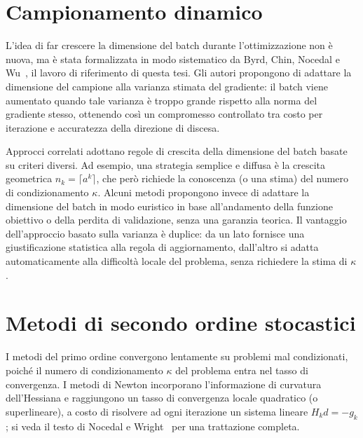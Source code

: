 \documentclass[italian, a4paper, twoside, binding=6mm]{sapthesis}
\begin{document}
\section{Campionamento dinamico}

L'idea di far crescere la dimensione del batch durante l'ottimizzazione
non è nuova, ma è stata formalizzata in modo sistematico da Byrd, Chin, Nocedal
e Wu~\cite{byrd2012}, il lavoro di riferimento di questa tesi. Gli autori
propongono di adattare la dimensione del campione alla varianza stimata del
gradiente: il batch viene aumentato quando tale varianza è troppo grande
rispetto alla norma del gradiente stesso, ottenendo così un compromesso
controllato tra costo per iterazione e accuratezza della direzione di discesa.

Approcci correlati adottano regole di crescita della dimensione del batch
basate su criteri diversi. Ad esempio, una strategia semplice e diffusa è la
crescita geometrica $n_k = \lceil a^k \rceil$, che però richiede la
conoscenza (o una stima) del numero di condizionamento $\kappa$. Alcuni metodi
propongono invece di adattare la dimensione del batch in modo euristico in base
all'andamento della funzione obiettivo o della perdita di validazione, senza
una garanzia teorica. Il vantaggio dell'approccio basato sulla varianza è
duplice: da un lato fornisce una giustificazione statistica alla regola
di aggiornamento, dall'altro si adatta automaticamente alla difficoltà locale
del problema, senza richiedere la stima di $\kappa$.

\section{Metodi di secondo ordine stocastici}

I metodi del primo ordine convergono lentamente su problemi mal condizionati,
poiché il numero di condizionamento $\kappa$ del problema entra nel tasso di
convergenza. I metodi di Newton incorporano l'informazione di curvatura
dell'Hessiana e raggiungono un tasso di convergenza locale quadratico (o
superlineare), a costo di risolvere ad ogni iterazione un sistema lineare
$H_k d = -g_k$; si veda il testo di Nocedal e Wright~\cite{nocedal2006} per
una trattazione completa.
\end{document}
